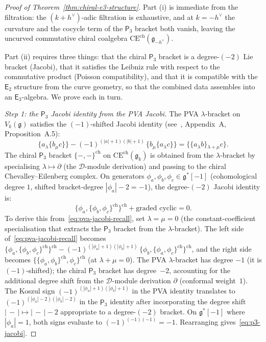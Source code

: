 \documentclass[11pt,reqno]{amsart}
\theoremstyle{definition}
\theoremstyle{remark}
\newcommand{\cD}{\mathcal{D}}
\newcommand{\CE}{\mathrm{CE}}
\newcommand{\Etwo}{\mathsf{E}_{2}}
\newcommand{\Ethree}{\mathsf{E}_{3}}
\newcommand{\Pthree}{\mathsf{P}_{3}}
\newcommand{\fg}{\mathfrak{g}}
\numberwithin{equation}{section}
\begin{document}
\begin{proof}[Proof of Theorem~\ref{thm:chiral-e3-structure}]
Part (i) is immediate from the filtration: the $(k+h^\vee)$-adic
filtration is exhaustive, and at $k = -h^\vee$ the curvature
and the cocycle term of the $\Pthree$ bracket both vanish,
leaving the uncurved commutative chiral coalgebra
$\CE^{\mathrm{ch}}(\fg_{-h^\vee})$.

Part (ii) requires three things: that the chiral
$\Pthree$ bracket is a degree-$(-2)$ Lie bracket
(Jacobi), that it satisfies the Leibniz rule with respect
to the commutative product (Poisson compatibility), and
that it is compatible with the $\Etwo$ structure from
the curve geometry, so that the combined data assembles
into an $\Ethree$-algebra. We prove each in turn.

\textit{Step 1: the $\Pthree$ Jacobi identity from the
PVA Jacobi.}
The PVA $\lambda$-bracket on $V_k(\fg)$ satisfies the
$(-1)$-shifted Jacobi identity
(see~\cite{Lorgat26II}, Appendix~A, Proposition~A.5):
\begin{equation}\label{eq:pva-jacobi-recall}
  \{a \mathbin{{}_\lambda} \{b \mathbin{{}_\mu} c\}\}
  - (-1)^{(|a|+1)(|b|+1)}\,
  \{b \mathbin{{}_\mu} \{a \mathbin{{}_\lambda} c\}\}
  = \{\{a \mathbin{{}_\lambda} b\}
  \mathbin{{}_{{\lambda+\mu}}} c\}.
\end{equation}
The chiral $\Pthree$ bracket
$\{-,-\}^{\mathrm{ch}}$
on $\CE^{\mathrm{ch}}(\fg_k)$ is obtained from the
$\lambda$-bracket by specialising $\lambda \mapsto \partial$
(the $\cD$-module derivation) and passing to the chiral
Chevalley--Eilenberg complex. On generators
$\phi_a, \phi_b, \phi_c \in \fg^*[-1]$
(cohomological degree $1$, shifted bracket-degree
$|\phi_a| - 2 = -1$), the degree-$(-2)$ Jacobi identity
is:
\begin{equation}\label{eq:p3-jacobi}
  \{\phi_a, \{\phi_b, \phi_c\}^{\mathrm{ch}}\}^{\mathrm{ch}}
  + \text{graded cyclic}
  = 0.
\end{equation}
To derive this from~\eqref{eq:pva-jacobi-recall}, set
$\lambda = \mu = 0$ (the constant-coefficient specialisation
that extracts the $\Pthree$ bracket from the
$\lambda$-bracket). The left side
of~\eqref{eq:pva-jacobi-recall} becomes
$\{\phi_a, \{\phi_b, \phi_c\}^{\mathrm{ch}}\}^{\mathrm{ch}}
- (-1)^{(|\phi_a|+1)(|\phi_b|+1)}\,
\{\phi_b, \{\phi_a, \phi_c\}^{\mathrm{ch}}\}^{\mathrm{ch}}$,
and the right side becomes
$\{\{\phi_a, \phi_b\}^{\mathrm{ch}},
\phi_c\}^{\mathrm{ch}}$ (at $\lambda + \mu = 0$).
The PVA $\lambda$-bracket has degree $-1$ (it is
$(-1)$-shifted); the chiral $\Pthree$ bracket has
degree~$-2$, accounting for the additional degree shift
from the $\cD$-module derivation $\partial$ (conformal
weight~$1$). The Koszul sign
$(-1)^{(|\phi_a|+1)(|\phi_b|+1)}$ in the PVA identity
translates to $(-1)^{(|\phi_a|-2)(|\phi_b|-2)}$ in the
$\Pthree$ identity after incorporating the degree shift
$|\,{-}\,| \mapsto |\,{-}\,| - 2$ appropriate to a
degree-$(-2)$ bracket. On $\fg^*[-1]$ where
$|\phi_a| = 1$, both signs evaluate to
$(-1)^{(-1)(-1)} = -1$. Rearranging
gives~\eqref{eq:p3-jacobi}.


\end{proof}
\end{document}
